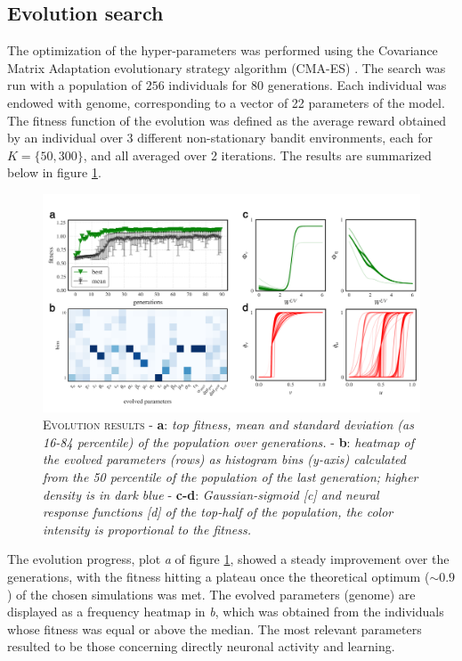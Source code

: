 \subsection{Evolution search}
The optimization of the hyper-parameters was performed using the Covariance Matrix Adaptation evolutionary strategy algorithm (CMA-ES) \cite{igelCovarianceMatrixAdaptation2007}.
The search was run with a population of $256$ individuals for $80$ generations. Each individual was endowed with genome, corresponding to a vector of 22 parameters of the model.
The fitness function of the evolution was defined as the average reward obtained by an individual over 3 different non-stationary bandit environments, each for $K=\{50, 300\}$, and all averaged over 2 iterations.
The results are summarized below in figure \ref{fig:evolution}.

\begin{figure}[H]
    \centering
    \includegraphics[width=1.0\textwidth]{figures/evolution_comp_1.png}
    \caption{\textsc{Evolution results} - \textbf{a}: \textit{top fitness, mean and standard deviation (as 16-84 percentile) of the population over generations.} - \textbf{b}: \textit{heatmap of the evolved parameters (rows) as histogram bins (y-axis) calculated from the 50 percentile of the
    population of the last generation; higher density is in dark blue} - \textbf{c-d}: \textit{Gaussian-sigmoid [c] and neural response functions [d] of the top-half of the population, the color intensity is proportional to the fitness.}}
    \label{fig:evolution}
\end{figure}

\noindent The evolution progress, plot \textit{a} of figure \ref{fig:evolution}, showed a steady improvement over the generations, with the fitness hitting a plateau once the theoretical optimum ($\sim 0.9$) of the chosen simulations was met.
The evolved parameters (genome) are displayed as a frequency heatmap in \textit{b}, which was obtained from the individuals whose fitness was equal or above the median. The most relevant parameters resulted to be those concerning directly neuronal activity and learning.

